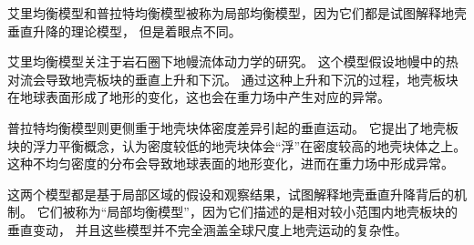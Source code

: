 \documentclass[12pt,a4paper]{article}
\begin{document}
艾里均衡模型和普拉特均衡模型被称为局部均衡模型，因为它们都是试图解释地壳垂直升降的理论模型，
但是着眼点不同。

艾里均衡模型关注于岩石圈下地幔流体动力学的研究。
这个模型假设地幔中的热对流会导致地壳板块的垂直上升和下沉。
通过这种上升和下沉的过程，地壳板块在地球表面形成了地形的变化，这也会在重力场中产生对应的异常。

普拉特均衡模型则更侧重于地壳块体密度差异引起的垂直运动。
它提出了地壳板块的浮力平衡概念，认为密度较低的地壳块体会“浮”在密度较高的地壳块体之上。
这种不均匀密度的分布会导致地球表面的地形变化，进而在重力场中形成异常。

这两个模型都是基于局部区域的假设和观察结果，试图解释地壳垂直升降背后的机制。
它们被称为“局部均衡模型”，因为它们描述的是相对较小范围内地壳板块的垂直变动，
并且这些模型并不完全涵盖全球尺度上地壳运动的复杂性。
\end{document}
